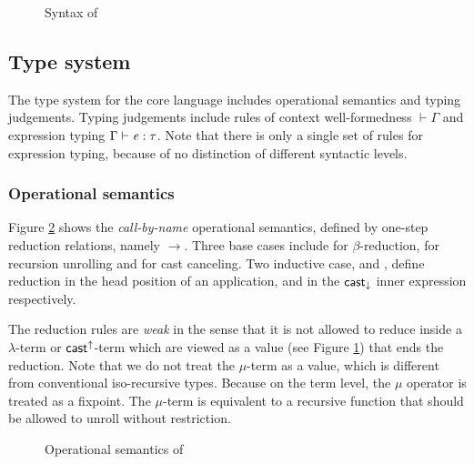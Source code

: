 \begin{figure}
    \gram{\otte\ottinterrule
        \ottG\ottinterrule
        \ottv}
    \caption{Syntax of \name}
    \label{fig:core:syntax}
\end{figure}

\subsection{Type system}\label{sec:core:type}
The type system for the core language includes operational semantics and typing judgements. Typing judgements include rules of context well-formedness $\vdash  \Gamma$ and expression typing $\Gamma  \vdash  \mathit{e}  :  \tau$. Note that there is only a single set of rules for expression typing, because of no distinction of different syntactic levels.

\subsubsection{Operational semantics}
Figure \ref{fig:core:opsem} shows the \emph{call-by-name} operational semantics, defined by one-step reduction relations, namely $ \longrightarrow $. Three base cases include  for $\beta$-reduction,  for recursion unrolling and  for cast canceling. Two inductive case,  and , define reduction in the head position of an application, and in the $ \mathsf{cast}_{\downarrow} $ inner expression respectively.

The reduction rules are \emph{weak} in the sense that it is not allowed to reduce inside a $\lambda$-term or $ \mathsf{cast}^{\uparrow} $-term which are viewed as a value (see Figure \ref{fig:core:syntax}) that ends the reduction. Note that we do not treat the $ \mu $-term as a value, which is different from conventional iso-recursive types. Because on the term level, the $ \mu $ operator is treated as a fixpoint. The $ \mu $-term is equivalent to a recursive function that should be allowed to unroll without restriction.

\begin{figure}
    \ottdefnstep{}
    \caption{Operational semantics of \name}
    \label{fig:core:opsem}
\end{figure}

